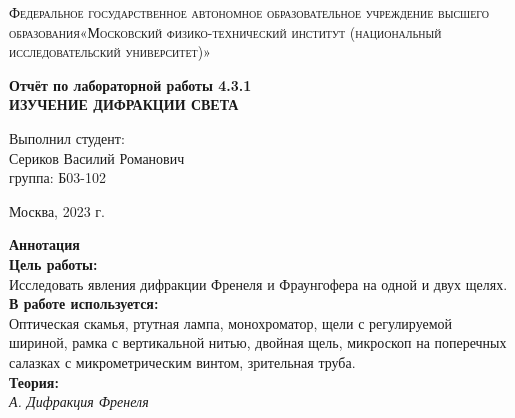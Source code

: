 \documentclass[a4paper, 12pt]{article}%
\begin{document}
	\begin{titlepage}
		\begin{center}
			\textsc{Федеральное государственное автономное образовательное учреждение высшего образования«Московский физико-технический институт (национальный исследовательский университет)»\\[5mm]
			}
			
			\vfill
			
			\textbf{Отчёт по лабораторной работы 4.3.1\\[3mm]
				ИЗУЧЕНИЕ
				ДИФРАКЦИИ СВЕТА 
				\\[50mm]
			}
			
		\end{center}
		
		\hfill
		\begin{minipage}{.5\textwidth}
			Выполнил студент:\\[2mm]
			Сериков Василий Романович\\[2mm]
			группа: Б03-102\\[5mm]
			
		\end{minipage}
		\vfill
		\begin{center}
			Москва, 2023 г.
		\end{center}
		
	\end{titlepage}
	
	\newpage
	\setcounter{page}{2}
	\textbf{Аннотация}\\
	
	
	\textbf{Цель работы: }\\
	
	 Исследовать явления дифракции Френеля и Фраунгофера на одной и двух щелях.\\
	 
	 \textbf{В работе используется: }\\
	 
	 Оптическая скамья, ртутная лампа, монохроматор, щели с регулируемой шириной, рамка с вертикальной нитью, двойная щель, микроскоп на поперечных салазках с микрометрическим винтом, зрительная труба.\\
	 
	 \textbf{Теория: }\\
	 
	 \textit{А. Дифракция Френеля}\\
	 
\end{document}
